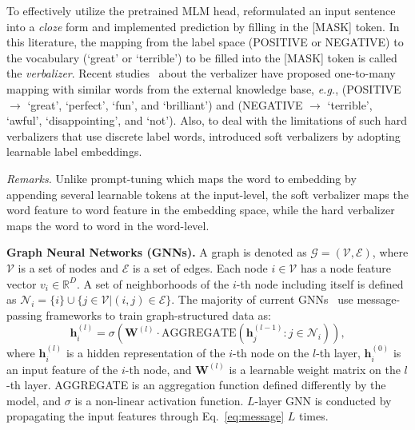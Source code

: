 \documentclass[10pt,twocolumn,letterpaper]{article}
\begin{document}
To effectively utilize the pretrained MLM head, \cite{schick2021exploiting} reformulated an input sentence into a \textit{cloze} form and implemented prediction by filling in the [MASK] token.
In this literature, the mapping from the label space (POSITIVE or NEGATIVE) to the vocabulary (`great' or `terrible') to be filled into the [MASK] token is called the \textit{verbalizer}.
Recent studies~\cite{hu2022knowledgeable,wang2022automatic} about the verbalizer have proposed one-to-many mapping with similar words from the external knowledge base, \textit{e.g.}, (POSITIVE $\rightarrow$ `great', `perfect', `fun', and `brilliant') and (NEGATIVE $\rightarrow$ `terrible', `awful', `disappointing', and `not').
Also, to deal with the limitations of such hard verbalizers that use discrete label words, \cite{cui2022prototypical, hambardzumyan2021warp, zhang2021differentiable} introduced soft verbalizers by adopting learnable label embeddings.

\noindent \textit{Remarks.}
Unlike prompt-tuning which maps the word to embedding by appending several learnable tokens at the input-level, the soft verbalizer maps the word feature to word feature in the embedding space, while the hard verbalizer maps the word to word in the word-level.

\noindent \textbf{Graph Neural Networks (GNNs).}
A graph is denoted as $\mathcal{G} = (\mathcal{V}, \mathcal{E})$, where $\mathcal{V}$ is a set of nodes and $\mathcal{E}$ is a set of edges.
Each node $i \in \mathcal{V}$ has a node feature vector $v_i \in \mathbb{R}^D$.
A set of neighborhoods of the $i$-th node including itself is defined as $\mathcal{N}_i = \{i\} \cup \{j \in \mathcal{V}|(i, j) \in \mathcal{E}\}$.
The majority of current GNNs~\cite{gilmer2017neural,kipf2016semi} use message-passing frameworks to train graph-structured data as:
\begin{equation}
    \mathbf{h}_i^{(l)} = \sigma \left(\mathbf{W}^{(l)} \cdot \text{AGGREGATE}\left(\mathbf{h}_j^{(l-1)}: j \in \mathcal{N}_i\right) \right),
    \label{eq:message}
\end{equation}
where $\mathbf{h}_i^{(l)}$ is a hidden representation of the $i$-th node on the $l$-th layer, $\mathbf{h}_i^{(0)}$ is an input feature of the $i$-th node, and $\mathbf{W}^{(l)}$ is a learnable weight matrix on the $l$-th layer.
AGGREGATE is an aggregation function defined differently by the model, and $\sigma$ is a non-linear activation function.
$L$-layer GNN is conducted by propagating the input features through Eq.~\eqref{eq:message} $L$ times.
\end{document}
